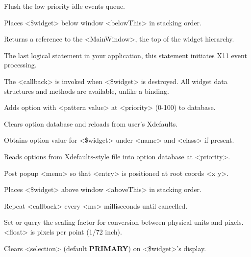 \begin{enum}{1cm}
Flush the low priority idle events queue.

Places <\$widget> below window <belowThis> in stacking order.

Returns a reference to the <MainWindow>, the top of the widget hierarchy.

The last logical statement in your application, this statement initiates
X11 event processing.

The <callback> is invoked when <\$widget> is destroyed.  All widget data
structures and methods are available, unlike a  binding.

Adds option with <pattern value> at <priority> (0-100) to database.

Clears option database and reloads from user's Xdefaults.

Obtains option value for <\$widget> under <name> and <class> if present.

Reads options from Xdefaults-style file into option database at <priority>.

Post popup <menu> so that <entry> is positioned at root coords <x y>.

Places <\$widget> above window <aboveThis> in stacking order.

Repeat <callback> every <ms> milliseconds until cancelled.

Set or query the scaling factor for conversion between physical units and
pixels.  <float> is pixels per point (1/72 inch).

Clears <selection> (default {\bf PRIMARY}) on <\$widget>'s display.


\end{enum}
